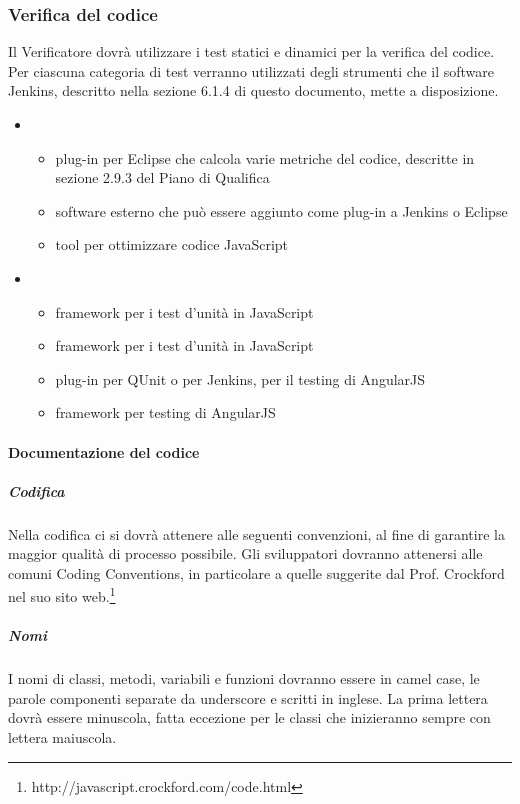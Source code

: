 \subsubsection{Verifica del codice}
Il Verificatore dovrà utilizzare i test statici e dinamici per la verifica del codice. Per ciascuna categoria di test verranno utilizzati degli strumenti che il software Jenkins, descritto nella sezione 6.1.4 di questo documento, mette a disposizione.
\begin{itemize}
\item {}
\begin{itemize}
\item {}plug-in per Eclipse che calcola varie metriche del codice, descritte in sezione 2.9.3 del Piano di Qualifica
\item {}software esterno che può essere aggiunto come plug-in a Jenkins o Eclipse
\item {}tool per ottimizzare codice JavaScript
\end{itemize}
\item {}
\begin{itemize}
\item {}framework per i test d'unità in JavaScript
\item {}framework per i test d'unità in JavaScript
\item {}plug-in per QUnit o per Jenkins, per il testing di AngularJS
\item {}framework per testing di AngularJS
\end{itemize}
\end{itemize}

\paragraph{Documentazione del codice}

\subparagraph{Codifica \\}
\label{}
Nella codifica ci si dovrà attenere alle seguenti convenzioni, al fine di garantire la maggior qualità di processo possibile.
Gli sviluppatori dovranno attenersi alle comuni Coding Conventions, in particolare a quelle suggerite dal Prof. Crockford nel suo sito web.\footnote{http://javascript.crockford.com/code.html}\\

\subparagraph{Nomi \\}
\label{}
I nomi di classi, metodi, variabili e funzioni dovranno essere in camel case, le parole componenti separate da underscore e scritti in inglese.
La prima lettera dovrà essere minuscola, fatta eccezione per le classi che inizieranno sempre con lettera maiuscola.

